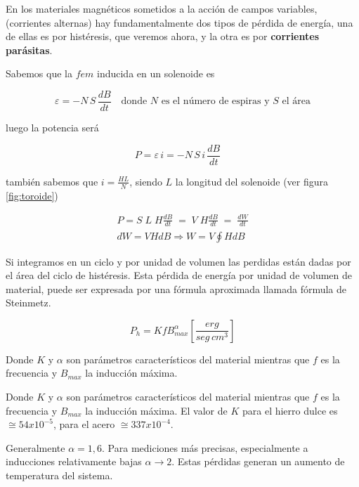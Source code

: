 En los materiales magnéticos sometidos a la acción de campos variables,(corrientes alternas) hay fundamentalmente dos tipos de pérdida de energía, una de ellas es por histéresis, que veremos ahora, y la otra es por \textbf{corrientes parásitas}.

Sabemos que la $fem$ inducida en un solenoide es

\begin{equation}
\varepsilon = - N\,S\, \frac{dB}{dt}\quad \text{donde $N$ es el número de espiras y $S$ el área} 
\end{equation}

luego la potencia será

\begin{equation}
P = \varepsilon\,i = - N\,S\,i\, \frac{dB}{dt}\quad 
\end{equation}


también sabemos que $i=\frac{HL}{N}$, siendo $L$ la longitud del solenoide (ver figura \ref{fig:toroide}) 

\begin{equation}
\begin{aligned}
P = S\; L \; H \frac{dB}{dt} \; = \; V \; H \frac{dB}{dt} \; = \; \frac{dW}{dt} \\
dW = V H dB \Rightarrow W = V \oint H dB 
\end{aligned}
\end{equation}

Si integramos en un ciclo y por unidad de volumen las perdidas están dadas por el área del ciclo de histéresis. Esta pérdida de energía por unidad de volumen de material, puede ser expresada por una fórmula aproximada llamada fórmula de Steinmetz.

\begin{equation}
P_{h} = K f B_{max}^{\alpha}\left[ \frac{erg}{seg  \, cm^{3}} \right] 
\end{equation}

Donde $K$ y $\alpha$ son parámetros característicos del material mientras que $f$ es la frecuencia y $B_{max}$ la inducción máxima. 

Donde $K$ y $\alpha$ son parámetros característicos del material mientras que $f$ es la frecuencia y $B_{max}$ la inducción máxima. El valor de $K$ para el hierro dulce es $\cong 54x10^{−5}$, para el acero $\cong 337x10^{−4}$.

Generalmente $\alpha = 1,6$. Para mediciones más precisas, especialmente a inducciones relativamente bajas ${\alpha\rightarrow 2}$. Estas pérdidas generan un aumento de temperatura del sistema.


